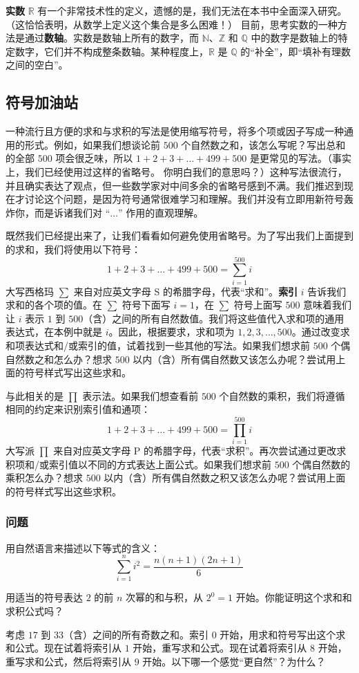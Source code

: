 \textbf{实数} $\mathbb{R}$ 有一个非常技术性的定义，遗憾的是，我们无法在本书中全面深入研究。（这恰恰表明，从数学上定义这个集合是多么困难！） 目前，思考实数的一种方法是通过\textbf{数轴}。实数是数轴上所有的数字，而 $\mathbb{N}$、$\mathbb{Z}$ 和 $\mathbb{Q}$ 中的数字是数轴上的特定数字，它们并不构成整条数轴。某种程度上，$\mathbb{R}$ 是 $\mathbb{Q}$ 的``补全''，即``填补有理数之间的空白''。

\subsection{符号加油站}\label{sec:section1.3.5}

一种流行且方便的求和与求积的写法是使用缩写符号，将多个项或因子写成一种通用的形式。例如，如果我们想谈论前 $500$ 个自然数之和，该怎么写呢？写出总和的全部 $500$ 项会很乏味，所以 $1+2+3+\dots+499+500$ 是更常见的写法。（事实上，我们已经使用过这样的省略号。 你明白我们的意思吗？）这种写法很流行，并且确实表达了观点，但一些数学家对中间多余的省略号感到不满。我们推迟到现在才讨论这个问题，是因为符号通常很难学习和理解。我们并没有立即用新符号轰炸你，而是诉诸我们对 ``$\dots$'' 作用的直观理解。

既然我们已经提出来了，让我们看看如何避免使用省略号。为了写出我们上面提到的求和，我们将使用以下符号：
\[1+2+3+\dots+499+500 = \sum_{i=1}^{500}i\]
大写西格玛 $\sum$ 来自对应英文字母 S 的希腊字母，代表``求和''。\textbf{索引} $i$ 告诉我们求和的各个项的值。在 $\sum$ 符号下面写 $i = 1$，在 $\sum$ 符号上面写 $500$ 意味着我们让 $i$ 表示 $1$ 到 $500$（含）之间的所有自然数值。我们将这些值代入求和项的通用表达式，在本例中就是 $i$。因此，根据要求，求和项为 $1,2,3,\dots,500$。通过改变求和项表达式和/或索引的值，试着找到一些其他的写法。如果我们想求前 $500$ 个偶自然数之和怎么办？想求 $500$ 以内（含）所有偶自然数又该怎么办呢？尝试用上面的符号样式写出这些求和。

与此相关的是 $\prod$ 表示法。如果我们想查看前 $500$ 个自然数的乘积，我们将遵循相同的约定来识别索引值和通项：
\[1+2+3+\dots+499+500 = \prod_{i=1}^{500}i\]
大写派 $\prod$ 来自对应英文字母 P 的希腊字母，代表``求积''。再次尝试通过更改求积项和/或索引值以不同的方式表达上面公式。如果我们想求前 $500$ 个偶自然数的乘积怎么办？想求 $500$ 以内（含）所有偶自然数之积又该怎么办呢？尝试用上面的符号样式写出这些求积。

\subsubsection*{问题}

\begin{problem}
    用自然语言来描述以下等式的含义：
    \[\sum_{i=1}^{n}i^2 = \frac{n(n+1)(2n+1)}{6}\]
\end{problem}
\begin{problem}
    用适当的符号表达 $2$ 的前 $n$ 次幂的和与积，从 $2^0=1$ 开始。你能证明这个求和和求积公式吗？
\end{problem}
\begin{problem}
    考虑 $17$ 到 $33$（含）之间的所有奇数之和。索引 $0$ 开始，用求和符号写出这个求和公式。现在试着将索引从 $1$ 开始，重写求和公式。现在试着将索引从 $8$ 开始，重写求和公式，然后将索引从 $9$ 开始。以下哪一个感觉``更自然''？为什么？
\end{problem}
